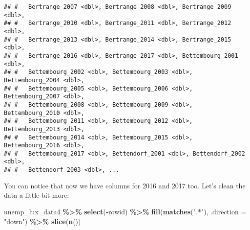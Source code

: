 \documentclass[
]{article}
\newenvironment{Shaded}{\begin{snugshade}}{\end{snugshade}}
\newcommand{\DataTypeTok}[1]{\textcolor[rgb]{0.13,0.29,0.53}{#1}}
\newcommand{\KeywordTok}[1]{\textcolor[rgb]{0.13,0.29,0.53}{\textbf{#1}}}
\newcommand{\NormalTok}[1]{#1}
\newcommand{\OperatorTok}[1]{\textcolor[rgb]{0.81,0.36,0.00}{\textbf{#1}}}
\newcommand{\StringTok}[1]{\textcolor[rgb]{0.31,0.60,0.02}{#1}}
\begin{document}
\begin{verbatim}
## #   Bertrange_2007 <dbl>, Bertrange_2008 <dbl>, Bertrange_2009 <dbl>,
## #   Bertrange_2010 <dbl>, Bertrange_2011 <dbl>, Bertrange_2012 <dbl>,
## #   Bertrange_2013 <dbl>, Bertrange_2014 <dbl>, Bertrange_2015 <dbl>,
## #   Bertrange_2016 <dbl>, Bertrange_2017 <dbl>, Bettembourg_2001 <dbl>,
## #   Bettembourg_2002 <dbl>, Bettembourg_2003 <dbl>, Bettembourg_2004 <dbl>,
## #   Bettembourg_2005 <dbl>, Bettembourg_2006 <dbl>, Bettembourg_2007 <dbl>,
## #   Bettembourg_2008 <dbl>, Bettembourg_2009 <dbl>, Bettembourg_2010 <dbl>,
## #   Bettembourg_2011 <dbl>, Bettembourg_2012 <dbl>, Bettembourg_2013 <dbl>,
## #   Bettembourg_2014 <dbl>, Bettembourg_2015 <dbl>, Bettembourg_2016 <dbl>,
## #   Bettembourg_2017 <dbl>, Bettendorf_2001 <dbl>, Bettendorf_2002 <dbl>,
## #   Bettendorf_2003 <dbl>, ...
\end{verbatim}

You can notice that now we have columns for 2016 and 2017 too. Let's clean the data a little bit more:

\begin{Shaded}
\begin{Highlighting}[]
\NormalTok{unemp\_lux\_data4 }\OperatorTok{\%\textgreater{}\%}\StringTok{ }
\StringTok{  }\KeywordTok{select}\NormalTok{(}\OperatorTok{{-}}\NormalTok{rowid) }\OperatorTok{\%\textgreater{}\%}\StringTok{ }
\StringTok{  }\KeywordTok{fill}\NormalTok{(}\KeywordTok{matches}\NormalTok{(}\StringTok{".*"}\NormalTok{), }\DataTypeTok{.direction =} \StringTok{"down"}\NormalTok{) }\OperatorTok{\%\textgreater{}\%}\StringTok{ }
\StringTok{  }\KeywordTok{slice}\NormalTok{(}\KeywordTok{n}\NormalTok{())}
\end{Highlighting}
\end{Shaded}
\end{document}
